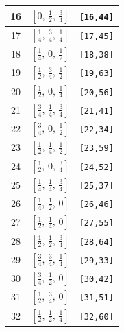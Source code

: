\documentclass[fleqn,8pt]{jsarticle}
\begin{document}
\begin{longtable}{ccc}
16 & $\left[ 0,\, \frac{1}{2},\, \frac{3}{4} \right]$ & {\tt [16,44]} \\ \hline
17 & $\left[ \frac{1}{4},\, \frac{3}{4},\, \frac{1}{4} \right]$ & {\tt [17,45]} \\ \hline
18 & $\left[ \frac{1}{4},\, 0,\, \frac{1}{2} \right]$ & {\tt [18,38]} \\ \hline
19 & $\left[ \frac{1}{2},\, \frac{3}{4},\, \frac{1}{2} \right]$ & {\tt [19,63]} \\ \hline
20 & $\left[ \frac{1}{2},\, 0,\, \frac{1}{4} \right]$ & {\tt [20,56]} \\ \hline
21 & $\left[ \frac{3}{4},\, \frac{1}{4},\, \frac{3}{4} \right]$ & {\tt [21,41]} \\ \hline
22 & $\left[ \frac{3}{4},\, 0,\, \frac{1}{2} \right]$ & {\tt [22,34]} \\ \hline
23 & $\left[ \frac{1}{2},\, \frac{1}{4},\, \frac{1}{2} \right]$ & {\tt [23,59]} \\ \hline
24 & $\left[ \frac{1}{2},\, 0,\, \frac{3}{4} \right]$ & {\tt [24,52]} \\ \hline
25 & $\left[ \frac{1}{4},\, \frac{1}{4},\, \frac{3}{4} \right]$ & {\tt [25,37]} \\ \hline
26 & $\left[ \frac{1}{4},\, \frac{1}{2},\, 0 \right]$ & {\tt [26,46]} \\ \hline
27 & $\left[ \frac{1}{2},\, \frac{1}{4},\, 0 \right]$ & {\tt [27,55]} \\ \hline
28 & $\left[ \frac{1}{2},\, \frac{1}{2},\, \frac{3}{4} \right]$ & {\tt [28,64]} \\ \hline
29 & $\left[ \frac{3}{4},\, \frac{3}{4},\, \frac{1}{4} \right]$ & {\tt [29,33]} \\ \hline
30 & $\left[ \frac{3}{4},\, \frac{1}{2},\, 0 \right]$ & {\tt [30,42]} \\ \hline
31 & $\left[ \frac{1}{2},\, \frac{3}{4},\, 0 \right]$ & {\tt [31,51]} \\ \hline
32 & $\left[ \frac{1}{2},\, \frac{1}{2},\, \frac{1}{4} \right]$ & {\tt [32,60]} \\
\end{longtable}
\renewcommand{\arraystretch}{1.2}
\end{document}
